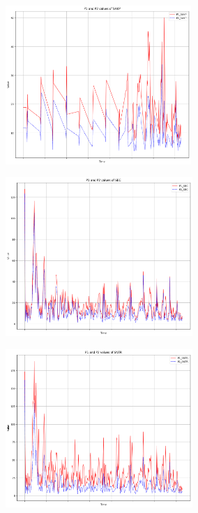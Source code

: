 \documentclass[12pt,a4paper,twoside]{scrartcl}
\numberwithin{equation}{section}
\begin{document}
\begin{figure}[H]
  \centering
  \begin{subfigure}[t]{0.32\textwidth}
    \includegraphics[width=\textwidth,height=6cm]{figures/1D_SAKP_plot}%
    \caption{}
  \end{subfigure}
  \begin{subfigure}[t]{0.32\textwidth}
    \includegraphics[width=\textwidth,height=6cm]{figures/1D_SBC_plot}%
    \caption{}
  \end{subfigure}
  \begin{subfigure}[t]{0.32\textwidth}
    \includegraphics[width=\textwidth,height=6cm]{figures/1D_SNTR_plot}%
    \caption{}
  \end{subfigure}


\end{figure}
\end{document}
